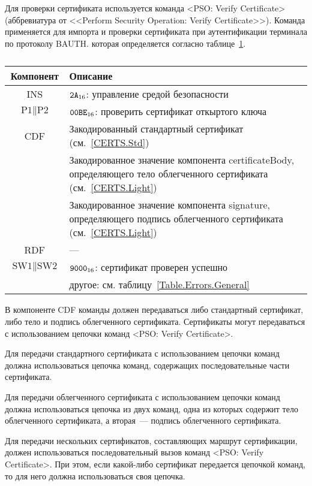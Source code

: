 Для проверки сертификата используется команда 
<PSO: Verify Certificate> (аббревиатура от <<Perform Security 
Operation: Verify Certificate>>).
Команда применяется для импорта и проверки 
сертификата при аутентификации терминала по протоколу BAUTH. 
которая определяется согласно 
таблице~\ref{Table.Oper.VerifyCertCmd}.

\begin{table}[hbt]
\caption{}\label{Table.Oper.VerifyCertCmd}
\begin{tabular}{|c|p{14cm}|}
\hline
Компонент & Описание\\ 
\hline
\hline
INS & $\texttt{2A}_{16}$: управление средой безопасности \\
\hline
$\text{P1} \parallel \text{P2}$ & $\texttt{00BE}_{16}$: проверить 
сертификат откыртого ключа \\ 
\hline
CDF & Закодированный стандартный сертификат (см.~\ref{CERTS.Std})\\
 & Закодированное значение компонента certificateBody, определяющего тело 
облегченного сертификата (см.~\ref{CERTS.Light})\\
 & Закодированное значение компонента signature, определяющего подпись 
облегченного сертификата (см.~\ref{CERTS.Light})\\
\hline 
RDF &  --- \\
\hline
$\text{SW1} \parallel \text{SW2}$ & $\texttt{9000}_{16}$: сертификат проверен успешно \\
 & другое: см. таблицу~\ref{Table.Errors.General} \\
\hline
\end{tabular}
\end{table}

В компоненте CDF команды должен передаваться либо стандартный сертификат, 
либо тело и подпись облегченного сертификата. Сертификаты могут 
передаваться с использованием цепочки команд <PSO: Verify Certificate>. 

Для передачи стандартного сертификата с использованием
цепочки команд должна использоваться цепочка команд,
содержащих последовательные части сертификата. 

Для передачи облегченного сертификата с использованием
цепочки команд должна использоваться цепочка из двух команд,
одна из которых содержит тело облегченного сертификата,
а вторая~--- подпись облегченного сертификата.

Для передачи нескольких сертификатов, составляющих маршрут 
сертификации, должен использоваться 
последовательный вызов команд <PSO: Verify Certificate>. 
При этом, 
если какой-либо сертификат передается цепочкой команд, 
то для него должна использоваться своя цепочка.

